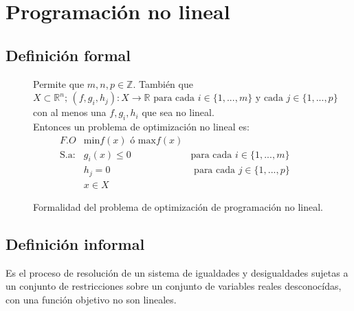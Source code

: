\documentclass[letterpaper, 12pt]{article}
\begin{document}
    \section{Programación no lineal}
    \subsection{Definición formal}
    \begin{figure}[H]
        \justify
        Permite que \(m,n,p\in\mathbb{Z}\). También que \(X\subset\mathbb{R}^n;\, (f,g_i,h_j):X\rightarrow \mathbb{R} \text{ para cada } i\in \{1,...,m\} \text{ y cada }j\in \{1,...,p\}\) con al menos una \(f,g_i,h_i\) que sea no lineal.
        \\Entonces un problema de optimización no lineal es:
        \[\begin{matrix}
            F.O&\text{min}f(x) \text{ ó max}f(x)&&\\
            \text{S.a:}&g_i(x)\leq 0&\text{para cada }i\in \{1,...,m\}\\
            &h_j=0&\text{ para cada }j\in \{1,...,p\}\\
            &x\in X
        \end{matrix}\]
        \caption{Formalidad del problema de optimización de programación no lineal.}
        \label{fig:formulazo}
    \end{figure}
    \subsection{Definición informal}
    Es el proceso de resolución de un sistema de igualdades y desigualdades sujetas a un conjunto de restricciones sobre un conjunto de variables reales desconocídas, con una función objetivo no son lineales.
\end{document}
